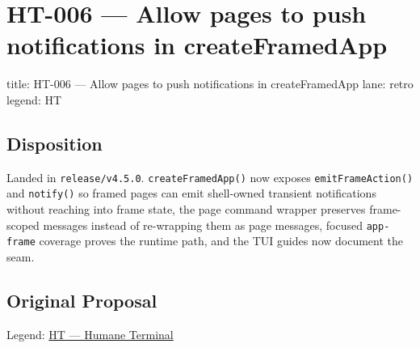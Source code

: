 \chapter{HT-006 --- Allow pages to push notifications in createFramedApp}\label{record-350}

\smallskip

\begin{RecordMeta}
title: HT-006 — Allow pages to push notifications in createFramedApp
lane: retro
legend: HT

\end{RecordMeta}

\section{Disposition}\label{record-350-disposition}

Landed in \texttt{r\allowbreak{}e\allowbreak{}l\allowbreak{}e\allowbreak{}a\allowbreak{}s\allowbreak{}e\allowbreak{}/\allowbreak{}v\allowbreak{}4\allowbreak{}.\allowbreak{}5\allowbreak{}.\allowbreak{}0}. \texttt{c\allowbreak{}r\allowbreak{}e\allowbreak{}a\allowbreak{}t\allowbreak{}e\allowbreak{}F\allowbreak{}r\allowbreak{}a\allowbreak{}m\allowbreak{}e\allowbreak{}d\allowbreak{}A\allowbreak{}p\allowbreak{}p\allowbreak{}(\allowbreak{})} now exposes \texttt{e\allowbreak{}m\allowbreak{}i\allowbreak{}t\allowbreak{}F\allowbreak{}r\allowbreak{}a\allowbreak{}m\allowbreak{}e\allowbreak{}A\allowbreak{}c\allowbreak{}t\allowbreak{}i\allowbreak{}o\allowbreak{}n\allowbreak{}(\allowbreak{})} and \texttt{n\allowbreak{}o\allowbreak{}t\allowbreak{}i\allowbreak{}f\allowbreak{}y\allowbreak{}(\allowbreak{})} so framed pages can emit shell-owned transient notifications without reaching into frame state, the page command wrapper preserves frame-scoped messages instead of re-wrapping them as page messages, focused \texttt{a\allowbreak{}p\allowbreak{}p\allowbreak{}-\allowbreak{}f\allowbreak{}r\allowbreak{}a\allowbreak{}m\allowbreak{}e} coverage proves the runtime path, and the TUI guides now document the seam.

\section{Original Proposal}\label{record-350-original-proposal}

Legend: \href{https://github.com/flyingrobots/bijou/blob/1853ad902f6bf219326409e7f743a5a1d6517dbc/docs/method/legends/HT-humane-terminal.md}{HT --- Humane Terminal}

